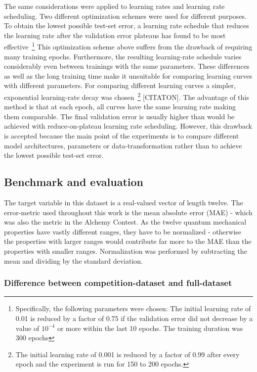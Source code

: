 The same considerations were applied to learning rates and learning rate scheduling. Two different optimization schemes were used for different purposes.
To obtain the lowest possible test-set error, a learning rate schedule that reduces the learning rate after the validation error plateaus has found to be most effective~\footnote{Specifically, the following parameters were chosen: The initial learning rate of 0.01 is reduced by a factor of 0.75 if the validation error did not decrease by a value of $10^{-4}$ or more within the last 10 epochs. The training duration was 300 epochs} This optimization scheme above suffers from the drawback of requiring many training epochs. Furthermore, the resulting learning-rate schedule varies considerably even between trainings with the same parameters. These differences as well as the long training time make it unsuitable for comparing learning curves with different parameters.
For comparing different learning curves a simpler, exponential learning-rate decay was chosen~\footnote{The initial learning rate of 0.001 is reduced by a factor of 0.99 after every epoch and the experiment is run for 150 to 200 epochs.} [CITATON]. The advantage of this method is that at each epoch, all curves have the same learning rate making them comparable. The final validation error is usually higher than would be achieved with reduce-on-plateau learning rate scheduling. However, this drawback is accepted because the main point of the experiments is to compare different model architectures, parameters or data-transformation rather than to achieve the lowest possible test-set error.


\subsection{Benchmark and evaluation}

The target variable in this dataset is a real-valued vector of length twelve. The error-metric used throughout this work is the mean absolute error (MAE) - which was also the metric in the Alchemy Contest. As the twelve quantum mechanical properties have vastly different ranges, they have to be normalized - otherwise the properties with larger ranges would contribute far more to the MAE than the properties with smaller ranges. Normalization was performed by subtracting the mean and dividing by the standard deviation.

\subsubsection{Difference between competition-dataset and full-dataset}

